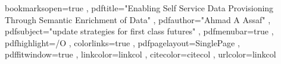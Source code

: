 \usepackage{fancyhdr}

\usepackage[left=1.4in,right=1.3in,top=1.1in,bottom=1.1in,includefoot,includehead,headheight=13.6pt]{geometry}

\usepackage[nottoc, notlof, notlot]{tocbibind}
\usepackage{minitoc}
\setcounter{minitocdepth}{2}
\mtcindent=15pt

\usepackage[intoc]{nomencl}
\renewcommand{\nomname}{List of Abbreviations}
\makenomenclature


\usepackage{ifpdf}

\ifpdf
  \usepackage[pdftex]{graphicx}
  \usepackage[pagebackref,hyperindex=true]{hyperref}
\else
  \usepackage{graphicx}
  \usepackage[dvipdfm,pagebackref,hyperindex=true]{hyperref}
\fi

\graphicspath{{.}{images/}}

\usepackage{color}


\hypersetup
{
  bookmarksopen=true                                                                     ,
  pdftitle="Enabling Self Service Data Provisioning Through Semantic Enrichment of Data" ,
  pdfauthor="Ahmad A Assaf"                                                              ,
  pdfsubject="update strategies for first class futures"                                 , %
  pdfmenubar=true                                                                        , %
  pdfhighlight=/O                                                                        , %
  colorlinks=true                                                                        , %
  pdfpagelayout=SinglePage                                                               , %
  pdffitwindow=true                                                                      , %
  linkcolor=linkcol                                                                      , %
  citecolor=citecol                                                                      , %
  urlcolor=linkcol                                                                         %
}


